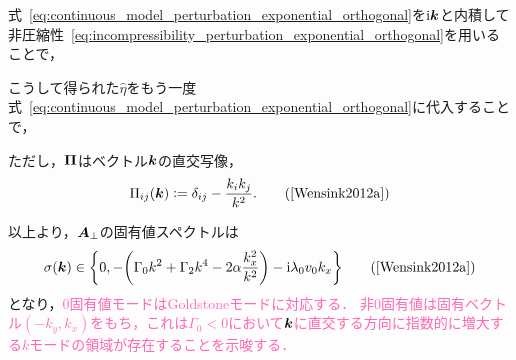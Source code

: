 \documentclass[12pt,dvipdfmx,svgnames,a4paper,uplatex]{ujarticle}
\theoremstyle{plain}
\begin{document}
式~\ref{eq:continuous_model_perturbation_exponential_orthogonal}を\(\mathrm{i}\vb*{k}\)と内積して非圧縮性~\ref{eq:incompressibility_perturbation_exponential_orthogonal}を用いることで，
こうして得られた\(\hat{\eta}\)をもう一度式~\ref{eq:continuous_model_perturbation_exponential_orthogonal}に代入することで，
ただし，\(\vb*{\Pi}\)はベクトル\(\vb*{k}\)の直交写像，
\begin{equation}
  \Pi_{ij}(\vb*{k}) \vcentcolon= \delta_{ij} - \frac{k_i k_j}{k^2}.
  \label{eq:Pi}
  \tag{\cite[Eq. 40]{Wensink2012a}}
\end{equation}

以上より，\(\vb*{A}_\bot\)の固有値スペクトルは
\begin{equation}
  \sigma(\vb*{k}) \in \qty{ 0, -\qty( \Gamma_0 k^2 + \Gamma_2 k^4 -2\alpha \frac{k_x^2}{k^2} ) -\mathrm{i} \lambda_0 v_0 k_x }
  \label{eq:eigenvalue_specrum}
  \tag{\cite[Eq. 42]{Wensink2012a}}
\end{equation}
となり，\textcolor{HotPink}{\(0\)固有値モードはGoldstoneモードに対応する．
非\(0\)固有値は固有ベクトル\((- k_y, k_x)\)をもち，これは\(\Gamma_0 < 0\)において\(\vb*{k}\)に直交する方向に指数的に増大する\(k\)モードの領域が存在することを示唆する．}
\end{document}
